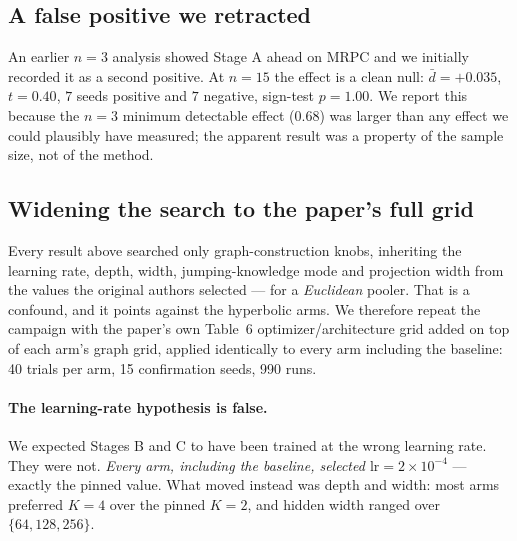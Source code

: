 \documentclass{article} %
\begin{document}
\subsection{A false positive we retracted}
An earlier $n=3$ analysis showed Stage A ahead on MRPC and we initially
recorded it as a second positive. At $n=15$ the effect is a clean null:
$\bar{d} = +0.035$, $t = 0.40$, $7$ seeds positive and $7$ negative,
sign-test $p = 1.00$. We report this because the $n=3$ minimum detectable
effect ($0.68$) was larger than any effect we could plausibly have measured;
the apparent result was a property of the sample size, not of the method.

\subsection{Widening the search to the paper's full grid}
\label{sec:wide}

Every result above searched only graph-construction knobs, inheriting the
learning rate, depth, width, jumping-knowledge mode and projection width from
the values the original authors selected --- for a \emph{Euclidean} pooler. That
is a confound, and it points against the hyperbolic arms. We therefore repeat
the campaign with the paper's own Table~6 optimizer/architecture grid added on
top of each arm's graph grid, applied identically to every arm including the
baseline: 40 trials per arm, 15 confirmation seeds, 990 runs.

\paragraph{The learning-rate hypothesis is false.} We expected Stages B and C to
have been trained at the wrong learning rate. They were not. \emph{Every arm,
including the baseline, selected $\mathrm{lr}=2\times10^{-4}$} --- exactly the
pinned value. What moved instead was depth and width: most arms preferred $K=4$
over the pinned $K=2$, and hidden width ranged over $\{64,128,256\}$.
\end{document}
